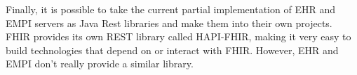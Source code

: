 \documentclass[sigconf]{acmart}
\begin{document}
Finally, it is possible to take the current partial implementation of EHR and EMPI servers as Java Rest libraries and make them into their own projects. FHIR provides its own REST library called HAPI-FHIR, making it very easy to build technologies that depend on or interact with FHIR. However, EHR and EMPI don’t really provide a similar library.

 
\end{document}
